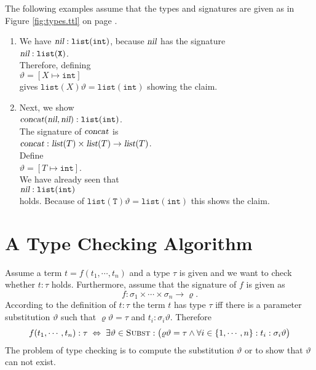 \examplesEng
The following examples assume that the types and signatures are given as in Figure
 \ref{fig:types.ttl} on page \pageref{fig:types.ttl}.
\begin{enumerate}
\item We have $\textsl{nil}: \mathtt{list(int)}$, 
      because $\textsl{nil}$ has the signature
      \\[0.2cm]
      \hspace*{1.3cm}
      $\textsl{nil}: \mathtt{list(X)}$. 
      \\[0.2cm]
      Therefore, defining
      \\[0.2cm]
      \hspace*{1.3cm}
      $\vartheta = [ X \mapsto \mathtt{int} ]$
      \\[0.2cm]
      gives $\mathtt{list}(X)\vartheta = \mathtt{list(int)}$ showing the claim.
\item Next, we show 
      \\[0.2cm]
      \hspace*{1.3cm}
      $\textsl{concat}(\textsl{nil}, \textsl{nil}): \mathtt{list(int)}$.
      \\[0.2cm]
      The signature of $\textsl{concat}$ is
      \\[0.2cm]
      \hspace*{1.3cm}
      $\textsl{concat}: \textsl{list}(T) \times \textsl{list}(T) \rightarrow \textsl{list}(T)$. 
      \\[0.2cm]
      Define
      \\[0.2cm]
      \hspace*{1.3cm}
      $\vartheta = [ T \mapsto \mathtt{int} ]$.
      \\[0.2cm]
      We have already seen that
      \\[0.2cm]
      \hspace*{1.3cm}
      $\textsl{nil}: \mathtt{list(int)}$
      \\[0.2cm]
      holds.  Because of $\mathtt{list(T)}\vartheta = \mathtt{list(int)}$ this shows the claim.  \eox
\end{enumerate}


\section{A Type Checking Algorithm}
Assume a  term $t = f(t_1,\cdots,t_n)$ and a type $\tau$ is given and we want to check
whether $t:\tau$ holds.  Furthermore, assume that the signature of  $f$ is given as
\[ f: \sigma_1 \times \cdots \times \sigma_n \rightarrow \varrho. \]
According to the definition of  $t:\tau$ the term $t$ has type $\tau$ iff there is a
parameter substitution $\vartheta$ such that $\varrho \vartheta = \tau$
and  $t_i:\sigma_i \vartheta$. Therefore
\[ 
           f(t_1,\cdots,t_n): \tau \;\Leftrightarrow\; 
           \exists \vartheta \in \textsc{Subst}: \bigl(\varrho \vartheta = \tau \wedge 
           \forall i \in \{1,\cdots,n\}: t_i : \sigma_i \vartheta \bigr)
\]
The problem of type checking is to compute the substitution $\vartheta$ or to show that
$\vartheta$ can not exist.
 

